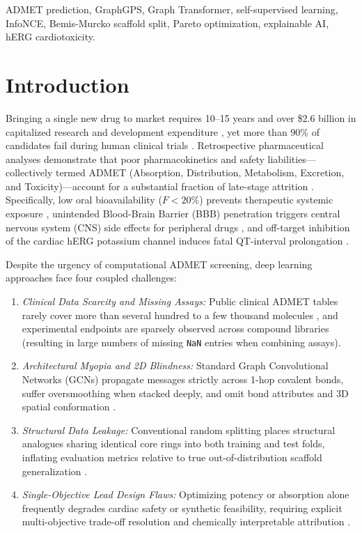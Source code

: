 \documentclass[conference]{IEEEtran}
\begin{document}
\begin{IEEEkeywords}
ADMET prediction, GraphGPS, Graph Transformer, self-supervised learning, InfoNCE, Bemis-Murcko scaffold split, Pareto optimization, explainable AI, hERG cardiotoxicity.
\end{IEEEkeywords}

\section{Introduction}
Bringing a single new drug to market requires 10--15 years and over \$2.6 billion in capitalized research and development expenditure \cite{DiMasi2016}, yet more than 90\% of candidates fail during human clinical trials \cite{Waring2015}. Retrospective pharmaceutical analyses demonstrate that poor pharmacokinetics and safety liabilities---collectively termed ADMET (Absorption, Distribution, Metabolism, Excretion, and Toxicity)---account for a substantial fraction of late-stage attrition \cite{Waring2015}. Specifically, low oral bioavailability ($F < 20\%$) prevents therapeutic systemic exposure \cite{Ma2008Bioavailability}, unintended Blood-Brain Barrier (BBB) penetration triggers central nervous system (CNS) side effects for peripheral drugs \cite{Martins2012BBB}, and off-target inhibition of the cardiac hERG potassium channel induces fatal QT-interval prolongation \cite{Wang2016hERG,Karim2021CardioTox}.

Despite the urgency of computational ADMET screening, deep learning approaches face four coupled challenges:
\begin{enumerate}
    \item \emph{Clinical Data Scarcity and Missing Assays:} Public clinical ADMET tables rarely cover more than several hundred to a few thousand molecules \cite{Huang2021TDC}, and experimental endpoints are sparsely observed across compound libraries (resulting in large numbers of missing \texttt{NaN} entries when combining assays).
    \item \emph{Architectural Myopia and 2D Blindness:} Standard Graph Convolutional Networks (GCNs) \cite{Kipf2017GCN} propagate messages strictly across 1-hop covalent bonds, suffer oversmoothing when stacked deeply, and omit bond attributes and 3D spatial conformation \cite{Riniker2015ETKDG,Rampasek2022GraphGPS}.
    \item \emph{Structural Data Leakage:} Conventional random splitting places structural analogues sharing identical core rings into both training and test folds, inflating evaluation metrics relative to true out-of-distribution scaffold generalization \cite{Bemis1996Murcko}.
    \item \emph{Single-Objective Lead Design Flaws:} Optimizing potency or absorption alone frequently degrades cardiac safety or synthetic feasibility, requiring explicit multi-objective trade-off resolution \cite{Derringer1980Desirability,Deb2002NSGA2} and chemically interpretable attribution \cite{Shrikumar2017InputGrad}.
\end{enumerate}
\end{document}
